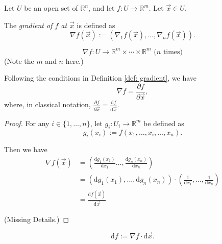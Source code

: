 \begin{definition}
	\label{def: gradient}
	Let $U$ be an open set of $\mathbb R^n$, and let $f: U \to \mathbb R^m$. Let $\vec x \in U$.
	
	The \textit{gradient of $f$ at $\vec x$} is defined as
	$$
	\nabla f(\vec x) := (\nabla_1 f(\vec x), \ldots, \nabla_n f(\vec x)).
	$$
\end{definition}


\begin{note}
	$$
	\nabla f: U \to \mathbb R^m \times \cdots \times \mathbb R^m \text{ ($n$ times)}
	$$
	(Note the $m$ and $n$ here.)
\end{note}



\begin{lemma}
	Following the conditions in Definition \ref{def: gradient}, we have
	$$
	\nabla f = \frac{\partial f}{\partial \vec x},
	$$
	where, in classical notation, $\frac{\partial f}{\partial \vec x} = \frac{\mathrm d f}{\mathrm d \vec x}$.
	
	\begin{proof}
		For any $i \in \{1, \ldots, n\}$, let $g_i : U_i \to \mathbb R^m$ be defined as
		$$
		g_i(x_i) := f(x_1, \ldots, x_i, \ldots, x_n).
		$$
	
		Then we have
		$$
		\begin{aligned}
			\nabla f(\vec x) &= \left( \frac{\mathrm d g_1 (x_1)}{\mathrm d x_1}
			\ldots , \frac{\mathrm d g_n(x_n)}{\mathrm d x_n} \right) \\
			&= \left( \mathrm d g_1 (x_1), \ldots, \mathrm d g_n (x_n) \right) \cdot \left(\frac{1}{\mathrm d x_1}, \ldots, \frac{1}{\mathrm d x_n} \right) \\
			&= \frac{\mathrm d f(\vec x)}{\mathrm d \vec x}
		\end{aligned}
		$$
		
		(Missing Details.)
	\end{proof}
\end{lemma}



\begin{definition}
	$$
	\mathrm d f := \nabla f \cdot \mathrm d\vec x.
	$$
\end{definition}



